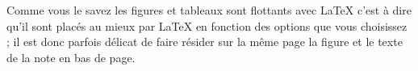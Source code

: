 \documentclass[a4paper,12pt,openright]{article}
\begin{document}
\begin{center}
{\begin{center}
\end{center}
}
%
\end{center} %

Comme vous le savez les figures  et tableaux sont flottants avec \LaTeX{} c’est
à dire qu’il sont placés au mieux par \LaTeX{} en fonction des options que vous
choisissez ; il est donc parfois délicat de faire résider sur la même page la figure
et le texte de la note en bas de page.
\end{document}
